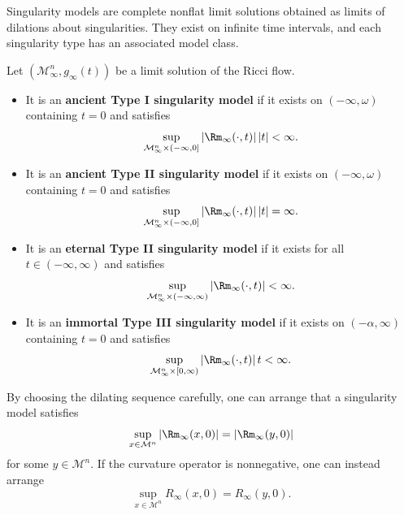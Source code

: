 \begin{remark}
\label{ch08-rem-singularity-models}

Singularity models are complete nonflat limit solutions obtained as limits of dilations about singularities. They exist on infinite time intervals, and each singularity type has an associated model class.
\end{remark}

\begin{definition}
\label{ch08-def-model-types}

Let \((\mathcal M_\infty^n,g_\infty(t))\) be a limit solution of the Ricci flow.
\begin{itemize}
\item It is an \textbf{ancient Type I singularity model} if it exists on \((-\infty,\omega)\) containing \(t=0\) and satisfies
\[
\sup_{\mathcal M_\infty^n\times(-\infty,0]} |\Rm_\infty(\cdot,t)|\,|t|<\infty.
\]
\item It is an \textbf{ancient Type II singularity model} if it exists on \((-\infty,\omega)\) containing \(t=0\) and satisfies
\[
\sup_{\mathcal M_\infty^n\times(-\infty,0]} |\Rm_\infty(\cdot,t)|\,|t|=\infty.
\]
\item It is an \textbf{eternal Type II singularity model} if it exists for all \(t\in(-\infty,\infty)\) and satisfies
\[
\sup_{\mathcal M_\infty^n\times(-\infty,\infty)} |\Rm_\infty(\cdot,t)|<\infty.
\]
\item It is an \textbf{immortal Type III singularity model} if it exists on \((-\alpha,\infty)\) containing \(t=0\) and satisfies
\[
\sup_{\mathcal M_\infty^n\times[0,\infty)} |\Rm_\infty(\cdot,t)|\,t<\infty.
\]
\end{itemize}
\end{definition}

\begin{remark}
\label{ch08-rem-point-picking}

By choosing the dilating sequence carefully, one can arrange that a singularity model satisfies
\[
\sup_{x\in \mathcal M^n} |\Rm_\infty(x,0)|=|\Rm_\infty(y,0)|
\]
for some \(y\in\mathcal M^n\). If the curvature operator is nonnegative, one can instead arrange
\[
\sup_{x\in \mathcal M^n} R_\infty(x,0)=R_\infty(y,0).
\]
\end{remark}

